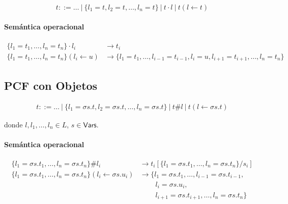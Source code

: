 \documentclass[twoside,a4paper,12pt]{article}
\theoremstyle{definition}
\theoremstyle{remark}
\begin{document}
\begin{equation*}
  t ::= \dots~|~\{l_1=t,l_2=t,\dots,l_n=t\}~|~t\cdot l~|~t(l\leftarrow t)
\end{equation*}

\paragraph{Semántica operacional}

\begin{align*}
  \{l_1=t_1,\dots,l_n=t_n\}\cdot l_i &\to t_i\\
  \{l_1=t_1,\dots,l_n=t_n\}(l_i\leftarrow u) &\to
  \{l_1=t_1,\dots,l_{i-1}=t_{i-1},l_i=u,l_{i+1}=t_{i+1},\dots,l_n=t_n\}
\end{align*}

\subsection{PCF con Objetos}

\begin{align*}
  t ::= \dots~|~\{l_1=\sigma s.t,l_2=\sigma s.t,\dots,l_n=\sigma s.t\}~|~t\#l~|~t(l\leftarrow \sigma s.t)
\end{align*}

donde $l,l_1,\dots,l_n\in L$, $s\in\mathsf{Vars}$.

\paragraph{Semántica operacional}

\begin{align*}
  \{l_1 = \sigma s.t_1,\dots,l_n = \sigma s.t_n\}\#l_i
    &\to t_i[\{l_1 = \sigma s.t_1,\dots,l_n = \sigma s.t_n\}/s_i] \\
  \{l_1 = \sigma s.t_1,\dots,l_n = \sigma s.t_n\}(l_i\leftarrow\sigma s.u_i)
    &\to \{l_1 = \sigma s.t_1,\dots,l_{i-1} = \sigma s.t_{i-1}, \\
    &~\qquad l_i = \sigma s.u_i, \\
    &~\qquad l_{i+1} = \sigma s.t_{i+1},\dots,l_n = \sigma s.t_n\}
\end{align*}
\end{document}
